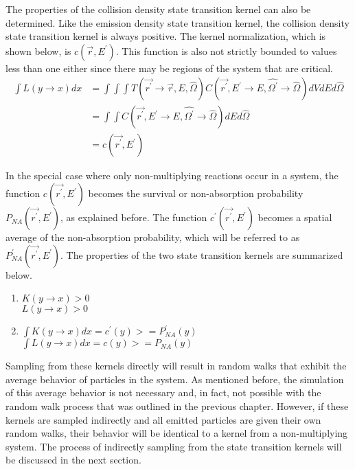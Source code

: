 The properties of the collision density state transition kernel can also be
determined. Like the emission density state transition kernel, the collision
density state transition kernel is always positive. The kernel normalization, 
which is shown below, is $c(\vec{r},E^{'})$. This function is also not strictly 
bounded to values less than one either since there may be regions of the system 
that are critical.
\begin{align}
  \int L(y \to x) dx & = \int\int\int
  T(\vec{r^{'}} \to \vec{r},E,\hat{\Omega})
  C(\vec{r^{'}},E^{'} \to E,\hat{\Omega^{'}} \to \hat{\Omega}) dV dE d\hat{\Omega}
  \nonumber \\
  & = \int\int 
  C(\vec{r^{'}},E^{'} \to E,\hat{\Omega^{'}} \to \hat{\Omega}) dE d\hat{\Omega} 
  \nonumber \\
  & = c(\vec{r^{'}},E^{'})
\end{align}

In the special case where only non-multiplying reactions occur in a system,
the function $c(\vec{r^{'}},E^{'})$ becomes the survival or non-absorption
probability $P_{NA}(\vec{r^{'}},E^{'})$, as explained before. The function
$c^{'}(\vec{r^{'}},E^{'})$ becomes a spatial average of the non-absorption
probability, which will be referred to as $P_{NA}^{'}(\vec{r^{'}},E^{'})$. 
The properties of the two state transition kernels are summarized below.
\begin{enumerate}
  \item $K(y \to x) > 0$ \\
    $L(y \to x) > 0$
  \item $\int K(y \to x)dx = c^{'}(y) >= P_{NA}^{'}(y)$ \\
    $\int L(y \to x)dx = c(y) >= P_{NA}(y)$
\end{enumerate}

Sampling from these kernels directly will result in random walks that exhibit 
the average behavior of particles in the system. As mentioned before, the 
simulation of this average behavior is not necessary and, in fact, not possible 
with the random walk process that was outlined in the previous chapter. 
However, if these kernels are sampled indirectly and all emitted particles are
given their own random walks, their behavior will be identical to a 
kernel from a non-multiplying system. The process of indirectly sampling from
the state transition kernels will be discussed in the next section.


